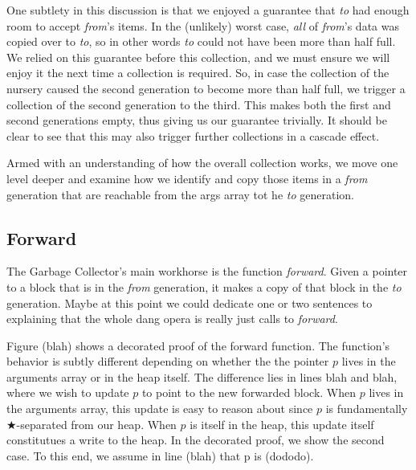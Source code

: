 One subtlety in this discussion is that we enjoyed a 
guarantee that \emph{to} had enough room to accept 
\emph{from}'s items. In the (unlikely) worst case, 
\emph{all} of \emph{from}'s data was copied over to \emph{to}, 
so in other words \emph{to} could not have been more than 
half full. We relied on this guarantee before this collection, 
and we must ensure we will enjoy it the next time a collection 
is required. So, in case the collection of the nursery caused
the second generation to become more than half full, we trigger
a collection of the second generation to the third. This makes 
both the first and second generations empty, thus giving us our 
guarantee trivially. It should be 
clear to see that this may also trigger further collections in 
a cascade effect. 

Armed with an understanding of how the overall collection 
works, we move one level deeper and examine how we identify and 
copy those items in a \emph{from} generation that are reachable
from the args array tot he \emph{to} generation.


\subsection{Forward}
\label{sec:gcforward}
The Garbage Collector's main workhorse is the function \emph{forward}.
Given a pointer to a block that is in the \emph{from} generation, 
it makes a copy of that block in the \emph{to} generation.
{\color{blue}Maybe at this point we could dedicate one or 
two sentences to explaining that the whole dang opera is really just 
calls to \emph{forward}.}

Figure (blah) shows a decorated proof of the forward function.
The function's behavior is subtly different depending on 
whether the the pointer $p$ lives in the arguments array or in the 
heap itself. The difference lies in lines blah and blah, where 
we wish to update $p$ to point to the new forwarded block. 
When $p$ lives in the arguments array, this update is easy to 
reason about since $p$ is fundamentally $\bigstar$-separated from our heap. 
When $p$ is itself in the heap, this update itself constitutues a
write to the heap. In the decorated proof, we show the second 
case. To this end, we assume in line (blah) that p is (dododo). 

